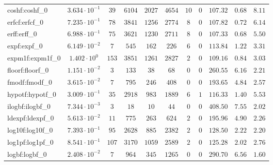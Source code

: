 \begin{tabular}{|l|c|c|c|c|c|c|c|c|c|c|}
coshf:coshf\_0               & $ 3.634 \cdot 10^{-1} $ & $ 39     $ & $ 6104   $ & $ 2027  $ & $ 4654  $ & $ 10  $ & $ 0 $ & $ 107.32      $ & $ 0.68    $ & $ 8.11    $ \\
erfcf:erfcf\_0               & $ 7.235 \cdot 10^{-1} $ & $ 78     $ & $ 3841   $ & $ 1256  $ & $ 2774  $ & $ 8   $ & $ 0 $ & $ 107.82      $ & $ 0.72    $ & $ 6.14    $ \\
erff:erff\_0                 & $ 6.988 \cdot 10^{-1} $ & $ 75     $ & $ 3621   $ & $ 1230  $ & $ 2711  $ & $ 8   $ & $ 0 $ & $ 107.33      $ & $ 0.68    $ & $ 5.50    $ \\
expf:expf\_0                 & $ 6.149 \cdot 10^{-2} $ & $ 7      $ & $ 545    $ & $ 162   $ & $ 226   $ & $ 6   $ & $ 0 $ & $ 113.84      $ & $ 1.22    $ & $ 3.31    $ \\
expm1f:expm1f\_0             & $ 1.402 \cdot 10^{0}  $ & $ 153    $ & $ 3851   $ & $ 1261  $ & $ 2827  $ & $ 2   $ & $ 0 $ & $ 109.16      $ & $ 0.84    $ & $ 3.03    $ \\
floorf:floorf\_0             & $ 1.151 \cdot 10^{-2} $ & $ 3      $ & $ 133    $ & $ 38    $ & $ 68    $ & $ 0   $ & $ 0 $ & $ 260.55      $ & $ 6.16    $ & $ 2.21    $ \\
fmodf:fmodf\_0               & $ 3.615 \cdot 10^{-2} $ & $ 7      $ & $ 795    $ & $ 246   $ & $ 408   $ & $ 0   $ & $ 0 $ & $ 193.65      $ & $ 4.84    $ & $ 2.57    $ \\
hypotf:hypotf\_0             & $ 3.009 \cdot 10^{-1} $ & $ 35     $ & $ 2918   $ & $ 983   $ & $ 1889  $ & $ 6   $ & $ 1 $ & $ 116.33      $ & $ 1.40    $ & $ 5.53    $ \\
ilogbf:ilogbf\_0             & $ 7.344 \cdot 10^{-3} $ & $ 3      $ & $ 18     $ & $ 10    $ & $ 44    $ & $ 0   $ & $ 0 $ & $ 408.50      $ & $ 7.55    $ & $ 2.02    $ \\
ldexpf:ldexpf\_0             & $ 5.613 \cdot 10^{-2} $ & $ 11     $ & $ 775    $ & $ 263   $ & $ 624   $ & $ 2   $ & $ 0 $ & $ 195.96      $ & $ 4.90    $ & $ 2.26    $ \\
log10f:log10f\_0             & $ 7.393 \cdot 10^{-1} $ & $ 95     $ & $ 2628   $ & $ 885   $ & $ 2382  $ & $ 2   $ & $ 0 $ & $ 128.50      $ & $ 2.22    $ & $ 2.20    $ \\
log1pf:log1pf\_0             & $ 8.541 \cdot 10^{-1} $ & $ 107    $ & $ 3170   $ & $ 1059  $ & $ 2589  $ & $ 2   $ & $ 0 $ & $ 125.28      $ & $ 2.02    $ & $ 2.76    $ \\
logbf:logbf\_0               & $ 2.408 \cdot 10^{-2} $ & $ 7      $ & $ 964    $ & $ 345   $ & $ 1265  $ & $ 0   $ & $ 0 $ & $ 290.70      $ & $ 6.56    $ & $ 1.60    $ \\

\end{tabular}
